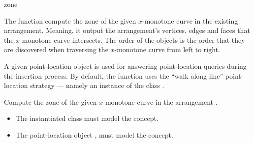\ccRefPageBegin

\begin{ccRefFunction}{zone}

\ccDefinition

The function \ccRefName{} compute the zone of the given $x$-monotone
curve in the existing arrangement. Meaning, it output the
arrangement's vertices, edges and faces that the $x$-monotone curve 
intersects. The order of the objects is the order that they are
discovered when traversing the $x$-monotone curve from left to right.

A given point-location object is used for answering point-location queries
during the insertion process. By default, the function uses the
``walk along line'' point-location strategy --- namely an instance of the
class .



Compute the zone of the given $x$-monotone curve  in the
arrangement .


\ccRequirements
\begin{itemize}
\item The instantiated  class must model the
   concept. 
\item The point-location object , must model the
   concept.
\end{itemize}

\end{ccRefFunction}

\ccRefPageEnd
